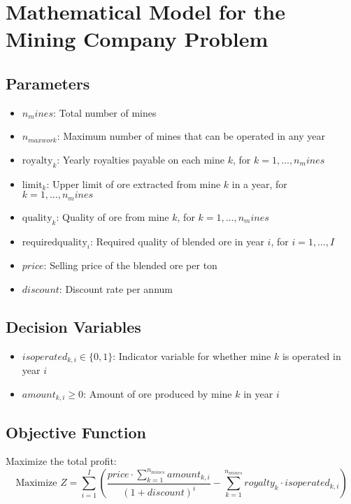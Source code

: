 \documentclass{article}
\begin{document}
\section*{Mathematical Model for the Mining Company Problem}

\subsection*{Parameters}
\begin{itemize}
    \item $n_mines$: Total number of mines
    \item $n_{maxwork}$: Maximum number of mines that can be operated in any year
    \item $\text{royalty}_k$: Yearly royalties payable on each mine $k$, for $k = 1, \ldots, n_mines$
    \item $\text{limit}_k$: Upper limit of ore extracted from mine $k$ in a year, for $k = 1, \ldots, n_mines$
    \item $\text{quality}_k$: Quality of ore from mine $k$, for $k = 1, \ldots, n_mines$
    \item $\text{requiredquality}_i$: Required quality of blended ore in year $i$, for $i = 1, \ldots, I$
    \item $price$: Selling price of the blended ore per ton
    \item $discount$: Discount rate per annum
\end{itemize}

\subsection*{Decision Variables}
\begin{itemize}
    \item $isoperated_{k,i} \in \{0, 1\}$: Indicator variable for whether mine $k$ is operated in year $i$
    \item $amount_{k, i} \geq 0$: Amount of ore produced by mine $k$ in year $i$
\end{itemize}

\subsection*{Objective Function}
Maximize the total profit:
\[
\text{Maximize } Z = \sum_{i=1}^{I} \left( \frac{price \cdot \sum_{k=1}^{n_{mines}} amount_{k,i}}{(1 + discount)^{i}} - \sum_{k=1}^{n_{mines}} royalty_k \cdot isoperated_{k,i} \right)
\]
\end{document}
